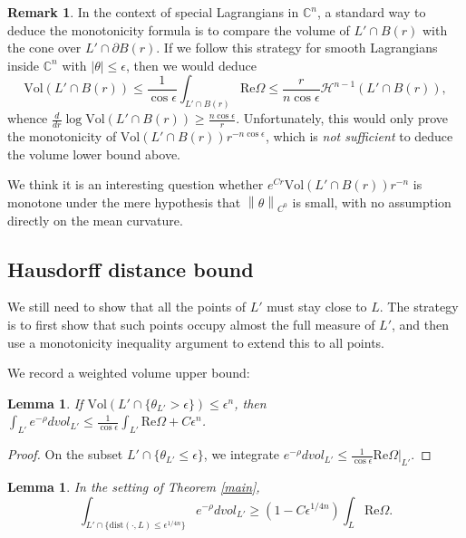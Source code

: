 \documentclass[a4paper]{article}
\newtheorem{lem}[thm]{Lemma}
\theoremstyle{definition}
\newtheorem{rmk}{Remark}
\newcommand{\C}{\mathbb{C}}
\newcommand{\norm}[1]{\left\lVert#1\right\rVert}
\begin{document}
\begin{rmk}
In the context of special Lagrangians in $\C^n$, a standard way to deduce the monotonicity formula is to compare the volume of $L'\cap B(r)$ with the cone over $L'\cap \partial B(r)$. If we follow this strategy for smooth Lagrangians inside $\C^n$ with $|\theta|\leq \epsilon$, then we would deduce
\[
\text{Vol}(L'\cap B(r)) \leq \frac{1}{\cos \epsilon} \int_{L'\cap B(r)} \text{Re}\Omega \leq   \frac{r}{n\cos \epsilon} \mathcal{H}^{n-1}(L'\cap B(r)),
\]
whence $\frac{d}{dr} \log \text{Vol}(L'\cap B(r)) \geq \frac{n\cos \epsilon}{r}$. Unfortunately, this would only prove the monotonicity of $\text{Vol}(L'\cap B(r)) r^{-n\cos \epsilon}$, which is \emph{not sufficient} to deduce the volume lower bound above.

We think it is an interesting question whether $e^{Cr}\text{Vol}(L'\cap B(r)) r^{-n}$ is monotone under the mere hypothesis that $\norm{\theta}_{C^0}$ is small, with no assumption directly on the mean curvature.
\end{rmk}





\subsection{Hausdorff distance bound}






We still need to show that all the points of $L'$ must stay close to $L$. The strategy is to first show that such points occupy almost the full measure of $L'$, and then use a monotonicity inequality argument to extend this to all points.



We record a weighted volume upper bound:

\begin{lem}\label{volumeupperbound}
If $\text{Vol}(L'\cap \{ \theta_{L'}>\epsilon  \})\leq \epsilon^n$, then $\int_{L'}e^{-\rho}dvol_{L'} \leq \frac{1}{\cos \epsilon} \int_{L'}\text{Re}\Omega+C\epsilon^n$.
\end{lem}


\begin{proof}
On the subset $L'\cap \{ \theta_{L'}\leq\epsilon  \}$, we integrate $e^{-\rho}dvol_{L'}\leq \frac{1}{\cos \epsilon} \text{Re}\Omega|_{L'}$.
\end{proof}



\begin{lem}
In the setting of Theorem \ref{main}, 
\begin{equation}\label{almostfullmeasure}
\int_{L'\cap \{   \text{dist}(\cdot, L)\leq \epsilon^{1/4n} \} } e^{-\rho}dvol_{L'} \geq (1- C\epsilon^{1/{4n}}) \int_L \text{Re}\Omega.
\end{equation}

\end{lem}
\end{document}
